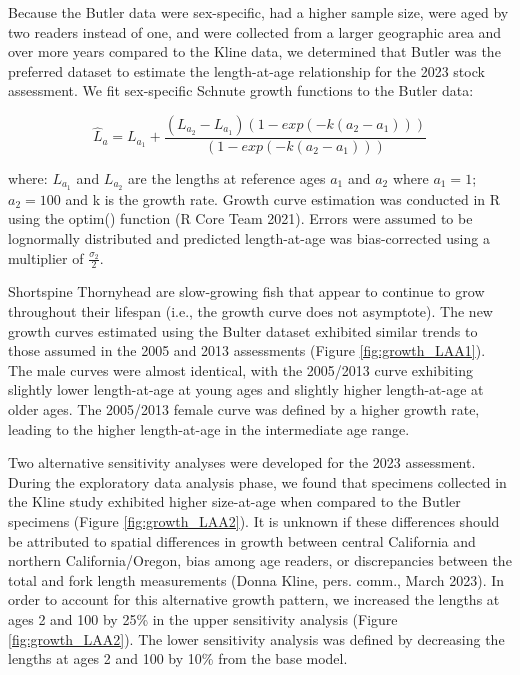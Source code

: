 \documentclass[11pt,
  english,
  letterpaper,
]{article}
\begin{document}
Because the Butler data were sex-specific, had a higher sample size, were aged by two readers instead of one, and were collected from a larger geographic area and over more years compared to the Kline data, we determined that Butler was the preferred dataset to estimate the length-at-age relationship for the 2023 stock assessment. We fit sex-specific Schnute growth functions to the Butler data:

\begin{equation} \hat{L}_{a} = L_{a_{1}}+\frac{(L_{a_{2}}-L_{a_{1}})(1-exp(-k(a_{2}-a_{1})))}{(1-exp(-k(a_{2}-a_{1})))}\end{equation}

where: \(L_{a_{1}}\) and \(L_{a_{2}}\) are the lengths at reference ages \(a_{1}\) and \(a_{2}\) where \(a_{1}=1\);\(a_{2}=100\) and k is the growth rate. Growth curve estimation was conducted in R using the optim() function (R Core Team 2021). Errors were assumed to be lognormally distributed and predicted length-at-age was bias-corrected using a multiplier of \(\frac{\sigma_2}{2}\).

Shortspine Thornyhead are slow-growing fish that appear to continue to grow throughout their lifespan (i.e., the growth curve does not asymptote). The new growth curves estimated using the Bulter dataset exhibited similar trends to those assumed in the 2005 and 2013 assessments (Figure \ref{fig:growth_LAA1}). The male curves were almost identical, with the 2005/2013 curve exhibiting slightly lower length-at-age at young ages and slightly higher length-at-age at older ages. The 2005/2013 female curve was defined by a higher growth rate, leading to the higher length-at-age in the intermediate age range.

Two alternative sensitivity analyses were developed for the 2023 assessment. During the exploratory data analysis phase, we found that specimens collected in the Kline study exhibited higher size-at-age when compared to the Butler specimens (Figure \ref{fig:growth_LAA2}). It is unknown if these differences should be attributed to spatial differences in growth between central California and northern California/Oregon, bias among age readers, or discrepancies between the total and fork length measurements (Donna Kline, pers. comm., March 2023). In order to account for this alternative growth pattern, we increased the lengths at ages 2 and 100 by 25\% in the upper sensitivity analysis (Figure \ref{fig:growth_LAA2}). The lower sensitivity analysis was defined by decreasing the lengths at ages 2 and 100 by 10\% from the base model.
\end{document}
